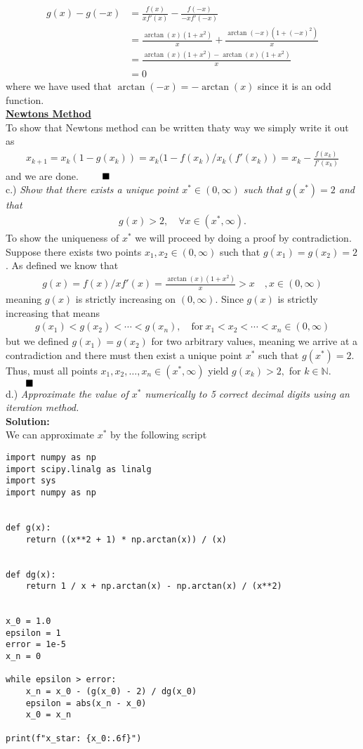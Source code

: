 \documentclass[12pt,
               a4paper,
               article,
               oneside,
               norsk,oldfontcommands]{memoir}
\newcommand{\Q}{ \qquad \hfill \blacksquare}
\newcommand{\spaze}{\vspace{4mm}\\}
\begin{document}
\begin{align*}
g(x) - g(-x) &= \frac{f(x)}{x f'(x)} - \frac{f(-x)}{-x f'(-x)} \\[5pt]
&= \frac{\arctan(x)(1 + x^2)}{x} + \frac{\arctan(-x) (1 + (-x)^2)}{x} \\[5pt]
&= \frac{\arctan(x)(1 + x^2) - \arctan(x)(1+x^2)}{x} \\[5pt]
&= 0
\end{align*}
where we have used that $\arctan(-x) = - \arctan(x)$ since it is an odd function. \spaze 
\underline{\textbf{Newtons Method}}\spaze 
To show that Newtons method can be written thaty way we simply write it out as 
\begin{align*}
x_{k+1} = x_k( 1 - g(x_k)) = x_k(1 - f(x_k)/x_k(f'(x_k)) = x_k - \frac{f(x_k)}{f'(x_k)}
\end{align*}
and we are done. $\Q$ \spaze 
c.) \emph{Show that there exists a unique point $x^{*} \in (0, \infty)$ such that $g(x^{*}) = 2$ and that}
\begin{align*}
g(x) > 2, \quad \forall x \in (x^{*}, \infty).
\end{align*}
To show the uniqueness of $x^{*}$ we will proceed by doing a proof by contradiction. \\ Suppose there exists two points $x_1, x_2 \in (0, \infty)$ such that $g(x_1) = g(x_2) = 2$. As defined we know that 
\begin{align*}
g(x) = f(x)/ xf'(x) = \frac{\arctan(x)(1+ x^2) }{x}  > x \quad,  x \in (0, \infty)
\end{align*}
meaning $g(x)$ is strictly increasing on $(0, \infty)$. Since $g(x)$ is strictly increasing that means 
\begin{align*}
g(x_1) < g(x_2) < \cdots < g(x_n), \quad \text{for} \ x_1 < x_2 < \cdots < x_n \in (0, \infty)
\end{align*}
but we defined $g(x_1) = g(x_2)$ for two arbitrary values, meaning we arrive at a contradiction and there must then exist a unique point $x^{*}$ such that $g(x^{*}) =2$. Thus, must all points $x_1, x_2, \ldots, x_n \in (x^{*}, \infty)$ yield $g(x_k) > 2,$ for $k \in \mathbb{N}$. $\Q$ \spaze 
d.) \emph{Approximate the value of $x^{*}$ numerically to 5 correct decimal digits using an iteration method.} \spaze 
\textbf{Solution:} \spaze 
We can approximate $x^{*}$ by the following script 
\begin{lstlisting}
import numpy as np
import scipy.linalg as linalg
import sys
import numpy as np


def g(x):
    return ((x**2 + 1) * np.arctan(x)) / (x)


def dg(x):
    return 1 / x + np.arctan(x) - np.arctan(x) / (x**2)


x_0 = 1.0
epsilon = 1
error = 1e-5
x_n = 0

while epsilon > error:
    x_n = x_0 - (g(x_0) - 2) / dg(x_0)
    epsilon = abs(x_n - x_0)
    x_0 = x_n
    
print(f"x_star: {x_0:.6f}")
\end{lstlisting}
\end{document}
